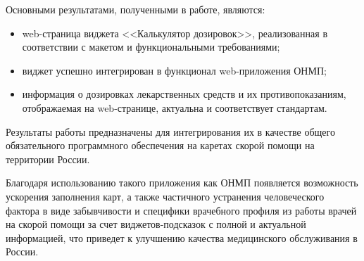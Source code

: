 Основными результатами, полученными в работе, являются:
\begin{itemize}

\item web-страница виджета <<Калькулятор дозировок>>, реализованная в соответствии с макетом и функциональными требованиями;

\item виджет успешно интегрирован в функционал web-приложения ОНМП;

\item информация о дозировках лекарственных средств и их противопоказаниям, отображаемая на web-странице, актуальна и соответствует стандартам.
\end{itemize}

Результаты работы предназначены для интегрирования их в качестве общего обязательного программного обеспечения на каретах скорой помощи на территории России.

Благодаря использованию такого приложения как ОНМП появляется возможность ускорения заполнения карт, а также частичного устранения человеческого фактора в виде забывчивости и специфики врачебного профиля из работы врачей на скорой помощи за счет виджетов-подсказок  с полной и актуальной информацией, что приведет к улучшению качества медицинского обслуживания в России.


